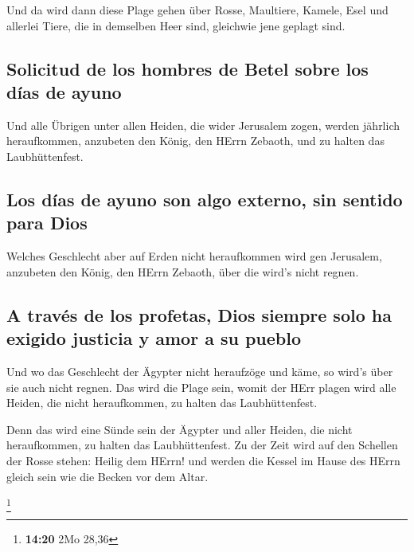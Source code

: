  Und da wird dann diese Plage gehen über Rosse,
Maultiere, Kamele, Esel und allerlei Tiere, die in demselben Heer sind,
gleichwie jene geplagt sind.

\hypertarget{solicitud-de-los-hombres-de-betel-sobre-los-duxedas-de-ayuno}{%
\subsection{Solicitud de los hombres de Betel sobre los días de
ayuno}\label{solicitud-de-los-hombres-de-betel-sobre-los-duxedas-de-ayuno}}

 Und alle Übrigen unter allen Heiden, die wider Jerusalem
zogen, werden jährlich heraufkommen, anzubeten den König, den HErrn
Zebaoth, und zu halten das Laubhüttenfest.

\hypertarget{los-duxedas-de-ayuno-son-algo-externo-sin-sentido-para-dios}{%
\subsection{Los días de ayuno son algo externo, sin sentido para
Dios}\label{los-duxedas-de-ayuno-son-algo-externo-sin-sentido-para-dios}}

 Welches Geschlecht aber auf Erden nicht heraufkommen
wird gen Jerusalem, anzubeten den König, den HErrn Zebaoth, über die
wird's nicht regnen.

\hypertarget{a-travuxe9s-de-los-profetas-dios-siempre-solo-ha-exigido-justicia-y-amor-a-su-pueblo}{%
\subsection{A través de los profetas, Dios siempre solo ha exigido
justicia y amor a su
pueblo}\label{a-travuxe9s-de-los-profetas-dios-siempre-solo-ha-exigido-justicia-y-amor-a-su-pueblo}}

 Und wo das Geschlecht der Ägypter nicht heraufzöge und
käme, so wird's über sie auch nicht regnen. Das wird die Plage sein,
womit der HErr plagen wird alle Heiden, die nicht heraufkommen, zu
halten das Laubhüttenfest.

 Denn das wird eine Sünde sein der Ägypter und aller
Heiden, die nicht heraufkommen, zu halten das Laubhüttenfest.
 Zu der Zeit wird auf den Schellen der Rosse stehen:
Heilig dem HErrn! und werden die Kessel im Hause des HErrn gleich sein
wie die Becken vor dem Altar.

\footnote{\textbf{14:20} 2Mo 28,36}

